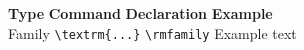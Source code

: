 \documentclass{article}
\newcommand{\head}[1]{\textbf{#1}}
\begin{document}
\begin{tabbing}
\head{Type} \= \head{Command} \= \head{Declaration} \=
  \head{Example}\\
Family \> \verb|\textrm{...}| \> \verb|\rmfamily|
    \> \rmfamily Example text\\
\end{tabbing}
\end{document}
